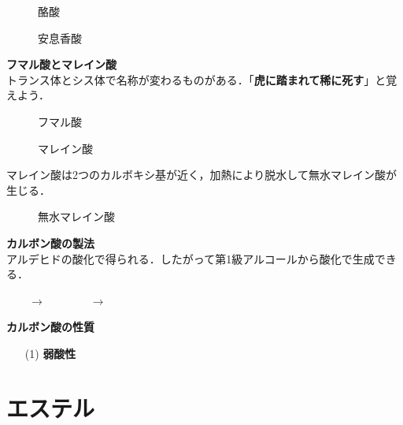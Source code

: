 \documentclass[a4paper,12pt]{ltjsreport}
\begin{document}
\begin{minipage}{0.5\linewidth}
\begin{figure}[H]
    \centering
\caption{酪酸} 
\end{figure}
\end{minipage}
\begin{minipage}{0.5\linewidth}
\begin{figure}[H]
    \centering
\caption{安息香酸} 
\end{figure}
\end{minipage}
\noindent \textbf{フマル酸とマレイン酸}\\
トランス体とシス体で名称が変わるものがある．「\textbf{虎に踏まれて稀に死す}」と覚えよう．
\begin{minipage}{0.5\linewidth}
\begin{figure}[H]
\centering
{}
\caption{フマル酸}
\end{figure}
\end{minipage}
\begin{minipage}{0.5\linewidth}
\begin{figure}[H]
\centering
{}
\caption{マレイン酸}
\end{figure}
\end{minipage}
マレイン酸は2つのカルボキシ基が近く，加熱により脱水して無水マレイン酸が生じる．
\begin{figure}[H]
\centering
{}
\caption{無水マレイン酸}
\end{figure}
\noindent \textbf{カルボン酸の製法}\\
アルデヒドの酸化で得られる．したがって第1級アルコールから酸化で生成できる．\\[4pt]
\centerline{~~~~$\longrightarrow$~~~~~~~~$\longrightarrow$~~~~}
\noindent\textbf{カルボン酸の性質}
\begin{itemize}
    \item [(1)]\textbf{弱酸性}
\end{itemize}
        \section{エステル}
\end{document}

